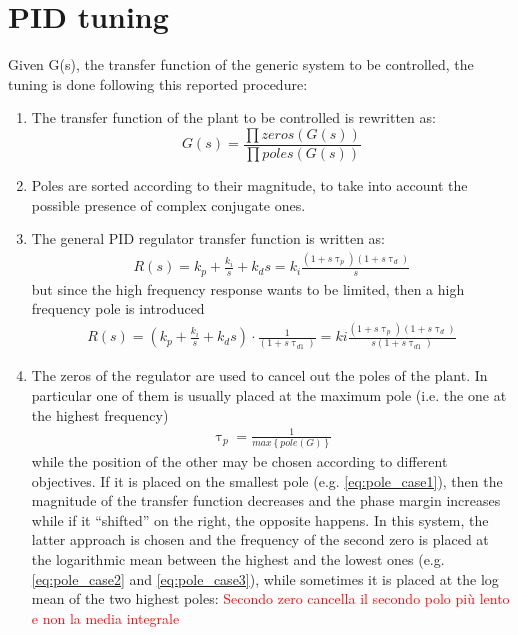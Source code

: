 \newpage
\section{PID tuning}\label{sec:e_pid_tuning}
 Given G(s), the transfer function of the generic system to be controlled, the tuning is done following this reported procedure:
 \begin{enumerate}
    \item The transfer function of the plant to be controlled is rewritten as:
    \begin{equation}
        G(s) = \frac{\prod zeros(G(s))}{\prod poles(G(s))}
    \end{equation}
    \item Poles are sorted according to their magnitude, to take into account the possible presence of complex conjugate ones. 
    \item The general PID regulator transfer function is written as:
    \begin{gather}
         R(s) = k_p+\frac{k_i}{s}+k_ds=k_i\frac{(1+s\uptau_p)(1+s\uptau_d)}{s}
         \label{eq:regulator3}
    \end{gather}
    but since the high frequency response wants to be limited, then a high frequency pole is introduced
    \begin{gather}
         R(s) = \left(k_p+\frac{k_i}{s}+k_ds\right)\cdot \frac{1}{(1+s\uptau_{d1})} = ki\frac{(1+s\uptau_p)(1+s\uptau_d)}{s(1+s\uptau_{d1})}
         \label{eq:regulator4}
    \end{gather}
    \item The zeros of the regulator are used to cancel out the poles of the plant. In particular one of them is usually placed at the maximum pole (i.e. the one at the highest frequency) 
    \begin{gather}
        \uptau_p =\frac{1}{max\left\{pole\left(G\right)\right\}}
    \end{gather}
    while the position of the other may be chosen according to different objectives. If it is placed on the smallest pole (e.g. \autoref{eq:pole_case1}), then the magnitude of the transfer function decreases and the phase margin increases while if it ``shifted'' on the right, the opposite happens. In this system, the latter approach is chosen and the frequency of the second zero is placed at the logarithmic mean between the highest and the lowest ones (e.g. \autoref{eq:pole_case2} and \ref{eq:pole_case3}), while sometimes it is placed at the log mean of the two highest poles: \textcolor{red}{Secondo zero cancella il secondo polo più lento e non la media integrale}

\end{enumerate}
